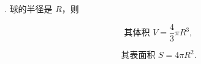 \documentclass[UTF8]{ctexart}
\begin{document}
. 球的半径是 $R$，则

\[
\text{其体积 } V=\frac{4}{3}\pi R^3,
\]

\[
\text{其表面积 } S=4\pi R^2.
\]
\end{document}

